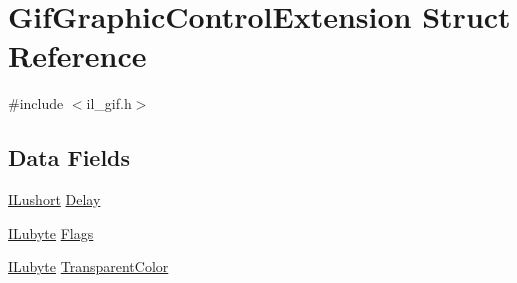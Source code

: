 \hypertarget{struct_gif_graphic_control_extension}{\section{Gif\-Graphic\-Control\-Extension Struct Reference}
\label{struct_gif_graphic_control_extension}
}


{\ttfamily \#include $<$il\-\_\-gif.\-h$>$}

\subsection*{Data Fields}
\begin{DoxyCompactItemize}
\item 
\hyperlink{il_8h_af6287b43748354a7c4864da43ae56962}{I\-Lushort} \hyperlink{struct_gif_graphic_control_extension_adb5a7af2d1389cea804a943ad14130eb}{Delay}
\item 
\hyperlink{il_8h_a8d2f04500100a86d1b00e98ab1b15a33}{I\-Lubyte} \hyperlink{struct_gif_graphic_control_extension_a4d4e57f611ec63d5199ee6ea1c56077e}{Flags}
\item 
\hyperlink{il_8h_a8d2f04500100a86d1b00e98ab1b15a33}{I\-Lubyte} \hyperlink{struct_gif_graphic_control_extension_abf65afac4e957a14fcdda071224c3f37}{Transparent\-Color}
\end{DoxyCompactItemize}


